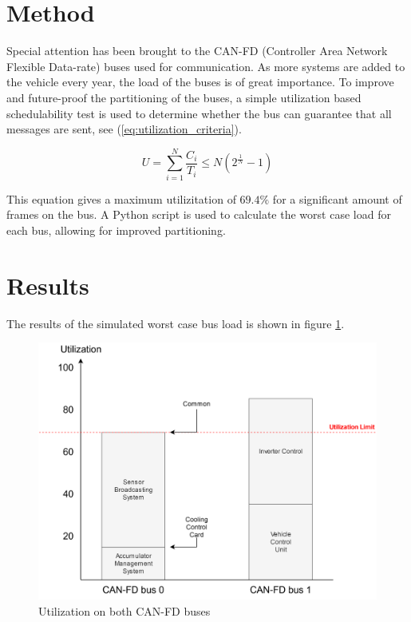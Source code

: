 \documentclass{article}
\begin{document}
\begin{multicols}{3}
\section*{Method}

Special attention has been brought to the CAN-FD (Controller Area Network Flexible Data-rate) buses used for communication. As more systems are added to the vehicle every year, the load of the buses is of great importance. To improve and future-proof the partitioning of the buses, a simple utilization based schedulability test is used to determine whether the bus can guarantee that all messages are sent, see (\ref{eq:utilization_criteria}).

\begin{equation}
    U=\sum_{i=1}^N\frac{C_i}{T_i}\leq N\left(2^\frac{1}{N}-1\right)
    \label{eq:utilization_criteria}
\end{equation}

This equation gives a maximum utilizitation of $69.4\%$ for a significant amount of frames on the bus. A Python script is used to calculate the worst case load for each bus, allowing for improved partitioning. %



\section*{Results}

The results of the simulated worst case bus load is shown in figure \ref{fig:utilization}.

\begin{figure}[H]
    \centering
    \includegraphics[width=.75\linewidth]{media/utilization.png}
    \caption{Utilization on both CAN-FD buses}
    \label{fig:utilization}
\end{figure}


\end{multicols}
\end{document}
